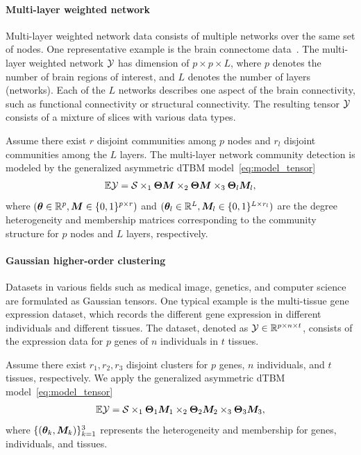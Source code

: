 \documentclass[lettersize,onecolumn,journal]{IEEEtran}
\theoremstyle{definition}
\theoremstyle{definition}
\begin{document}
\vspace{0.2cm}
\paragraph{Multi-layer weighted network} 
Multi-layer weighted network data consists of multiple networks over the same set of nodes. One representative example is the brain connectome data~\citep{zhang2019tensor}. The multi-layer weighted network $\mathcal{Y}$ has dimension of $p \times p \times L$, where $p$ denotes the number of brain regions of interest, and $L$ denotes the number of layers (networks). Each of the $L$ networks describes one aspect of the brain connectivity, such as functional connectivity or structural connectivity. The resulting tensor $\mathcal{Y}$ consists of a mixture of slices with various data types. 


Assume there exist $r$ disjoint communities among $p$ nodes and $r_l$ disjoint communities among the $L$ layers. The multi-layer network community detection is modeled by the generalized asymmetric dTBM model~\eqref{eq:model_tensor}
\begin{equation}
    \mathbb{E} \mathcal{Y} = \mathcal{S} \times_1 \boldsymbol{\Theta} \bm M \times_2 \boldsymbol{\Theta} \bm M \times_3 \boldsymbol{\Theta}_l \bm M_l, 
\end{equation}
where $(\boldsymbol{\theta} \in \mathbb{R}^p, \bm M \in \{0,1\}^{p \times r})$ and $ (\boldsymbol{\theta}_l \in \mathbb{R}^L, \bm M_l \in \{0,1\}^{L \times r_l})$ are the degree heterogeneity and membership matrices corresponding to the community structure for $p$ nodes and $L$ layers, respectively. 
\vspace{0.2cm}

\paragraph{Gaussian higher-order clustering} Datasets in various fields such as medical image, genetics, and computer science are formulated as Gaussian tensors. One typical example is the multi-tissue gene expression dataset, which records the different gene expression in different individuals and different tissues. The dataset, denoted as $\mathcal{Y} \in \mathbb{R}^{p \times n \times t}$, consists of the expression data for $p$ genes of $n$ individuals in $t$ tissues. 

Assume there exist $r_1, r_2, r_3$ disjoint clusters for $p$ genes, $n$ individuals, and $t$ tissues, respectively. We apply the generalized asymmetric dTBM model~\eqref{eq:model_tensor} 
\begin{equation}
    \mathbb{E}\mathcal{Y} = \mathcal{S} \times_1 \boldsymbol{\Theta}_1 \bm M_1 \times_2 \boldsymbol{\Theta}_2 \bm M_2 \times_3 \boldsymbol{\Theta}_3 \bm M_3, 
\end{equation}
where $\{(\boldsymbol{\theta}_k, \bm M_k)\}_{k=1}^3$ represents the heterogeneity and membership for genes, individuals, and tissues. \\
\end{document}
